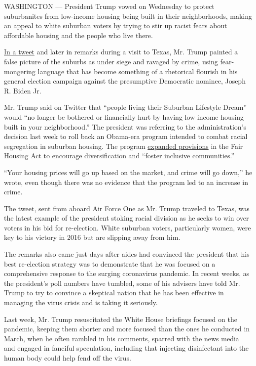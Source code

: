 WASHINGTON --- President Trump vowed on Wednesday to protect
suburbanites from low-income housing being built in their neighborhoods,
making an appeal to white suburban voters by trying to stir up racist
fears about affordable housing and the people who live there.

\href{https://twitter.com/realDonaldTrump/status/1288509568578777088?s=20}{In
a tweet} and later in remarks during a visit to Texas, Mr. Trump painted
a false picture of the suburbs as under siege and ravaged by crime,
using fear-mongering language that has become something of a rhetorical
flourish in his general election campaign against the presumptive
Democratic nominee, Joseph R. Biden Jr.

Mr. Trump said on Twitter that ``people living their Suburban Lifestyle
Dream'' would ``no longer be bothered or financially hurt by having low
income housing built in your neighborhood.'' The president was referring
to the administration's decision last week to roll back an Obama-era
program intended to combat racial segregation in suburban housing. The
program
\href{https://www.hud.gov/press/press_releases_media_advisories/HUD_No_20_109}{expanded
provisions} in the Fair Housing Act to encourage diversification and
``foster inclusive communities.''

``Your housing prices will go up based on the market, and crime will go
down,'' he wrote, even though there was no evidence that the program led
to an increase in crime.

The tweet, sent from aboard Air Force One as Mr. Trump traveled to
Texas, was the latest example of the president stoking racial division
as he seeks to win over voters in his bid for re-election. White
suburban voters, particularly women, were key to his victory in 2016 but
are slipping away from him.

The remarks also came just days after aides had convinced the president
that his best re-election strategy was to demonstrate that he was
focused on a comprehensive response to the surging coronavirus pandemic.
In recent weeks, as the president's poll numbers have tumbled, some of
his advisers have told Mr. Trump to try to convince a skeptical nation
that he has been effective in managing the virus crisis and is taking it
seriously.

Last week, Mr. Trump resuscitated the White House briefings focused on
the pandemic, keeping them shorter and more focused than the ones he
conducted in March, when he often rambled in his comments, sparred with
the news media and engaged in fanciful speculation, including that
injecting disinfectant into the human body could help fend off the
virus.

